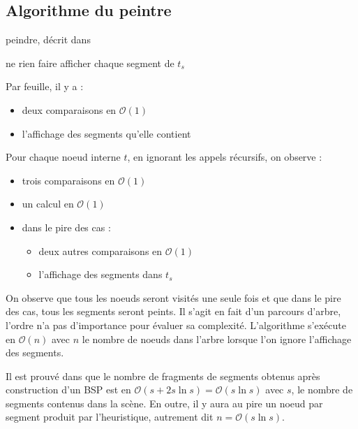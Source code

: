 \documentclass[12pt,twocolumn]{article}
\newcommand{\bigO}{\mathcal{O}}
\newcommand{\es}{\emptyset}
\begin{document}
\subsection{Algorithme du peintre}
\begin{algorithm}
\caption{peindre, décrit dans \cite[p.~255]{cg}}
\SetAlgoLined\DontPrintSemicolon
{}
\uIf{$t=\es$} {
	ne rien faire
}
\uElseIf{$(t^+=\es) \land (t^-=\es)$} {
	afficher chaque segment de $t_s$
}
~
\end{algorithm}

Par feuille, il y a :
\begin{itemize}
	\item deux comparaisons en $\bigO(1)$
	\item l'affichage des segments qu'elle contient
\end{itemize}

Pour chaque noeud interne $t$, en ignorant les appels récursifs, on observe :
\begin{itemize}
	\item trois comparaisons en $\bigO(1)$
	\item un calcul en $\bigO(1)$
	\item dans le pire des cas :
		\begin{itemize}
			\item deux autres comparaisons en $\bigO(1)$
			\item l'affichage des segments dans $t_s$
		\end{itemize}
\end{itemize}

On observe que tous les noeuds seront visités une seule fois et que dans le pire
des cas, tous les segments seront peints. Il s'agit en fait d'un parcours
d'arbre, l'ordre n'a pas d'importance pour évaluer sa complexité. L'algorithme
s'exécute en $\bigO(n)$ avec $n$ le nombre de noeuds dans l'arbre
lorsque l'on ignore l'affichage des segments.

Il est prouvé dans \cite[p.~258]{cg} que
le nombre de fragments de segments obtenus après construction d'un BSP
est en $\bigO(s+2s\ln s)=\bigO(s\ln s)$ avec $s$, le nombre
de segments contenus dans la scène.
En outre, il y aura au pire un noeud par segment produit par l'heuristique,
autrement dit $n=\bigO(s\ln s)$.
\end{document}
